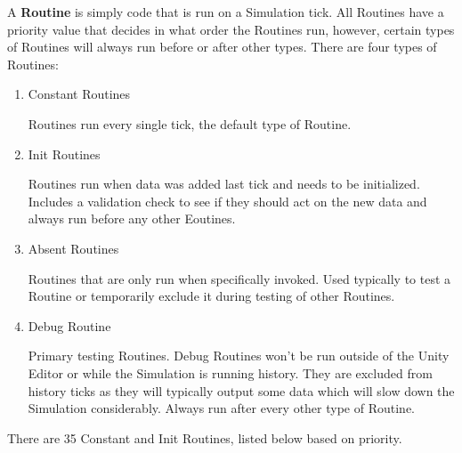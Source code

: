 \documentclass{report}
\begin{document}
A \textbf{Routine} is simply code that is run on a Simulation tick. All Routines have a priority value that decides in what order the Routines run, however, certain types of Routines will always run before or after other types. There are four types of Routines:

\begin{enumerate}
        \item Constant Routines

Routines run every single tick, the default type of Routine.

        \item Init Routines

Routines run when data was added last tick and needs to be initialized. Includes a validation check to see if they should act on the new data and always run before any other Eoutines.

        \item Absent Routines

Routines that are only run when specifically invoked. Used typically to test a Routine or temporarily exclude it during testing of other Routines.

        \item Debug Routine

Primary testing Routines. Debug Routines won't be run outside of the Unity Editor or while the Simulation is running history. They are excluded from history ticks as they will typically output some data which will slow down the Simulation considerably. Always run after every other type of Routine.

\end{enumerate}

There are 35 Constant and Init Routines, listed below based on priority.
\end{document}
